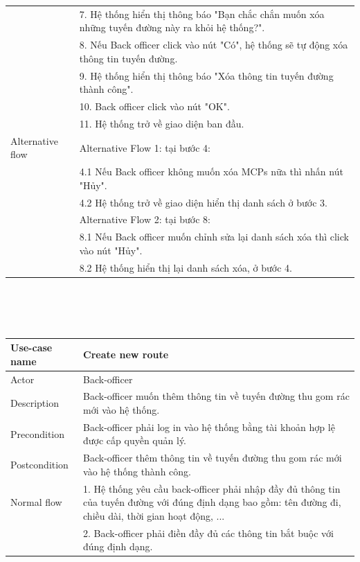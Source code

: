 \documentclass[a4paper]{article}
\begin{document}
\begin{enumerate}
\begin{enumerate}
\begin{tabular}{|p{3cm}|p{10cm}|}
         &7. Hệ thống hiển thị thông báo "Bạn chắc chắn muốn xóa những tuyến đường này ra khỏi hệ thống?". \\
         &8. Nếu Back officer click vào nút "Có", hệ thống sẽ tự động xóa thông tin tuyến đường. \\
         &9. Hệ thống hiển thị thông báo "Xóa thông tin tuyến đường thành công". \\
         &10. Back officer click vào nút "OK". \\
         &11. Hệ thống trở về giao diện ban đầu. \\
         \hline
         Alternative flow & 
         Alternative Flow 1: tại bước 4: \\
        &4.1 Nếu Back officer không muốn xóa MCPs nữa thì nhấn nút
        "Hủy". \\
        &4.2 Hệ thống trở về giao diện hiển thị danh sách ở bước 3.\\
        &Alternative Flow 2: tại bước 8:\\
        &8.1 Nếu Back officer muốn chỉnh sửa lại danh sách xóa thì click vào nút "Hủy". \\
        &8.2 Hệ thống hiển thị lại danh sách xóa, ở bước 4.\\
        \hline
    \end{tabular}
    \\ \\ \\
    \begin{tabular}{|p{3cm} | p{10cm} |}
    \hline
         Use-case name & \textbf{Create new route}  \\
         \hline
         Actor & Back-officer \\
         \hline
         Description & Back-officer muốn thêm thông tin về tuyến đường thu gom rác mới vào hệ thống. \\
         \hline
         Precondition & Back-officer phải log in vào hệ thống bằng tài khoản hợp lệ được cấp quyền quản lý. \\
         \hline 
         Postcondition & Back-officer thêm thông tin về tuyến đường thu gom rác mới vào hệ thống thành công. \\
         \hline
         Normal flow 
         &1. Hệ thống yêu cầu back-officer phải nhập đầy đủ thông tin của tuyến đường với đúng định dạng bao gồm: tên đường đi, chiều dài, thời gian hoạt động, ...\\
         &2. Back-officer phải điền đầy đủ các thông tin bắt buộc với đúng định dạng. \\

\end{tabular}
\end{enumerate}
\end{enumerate}
\end{document}
